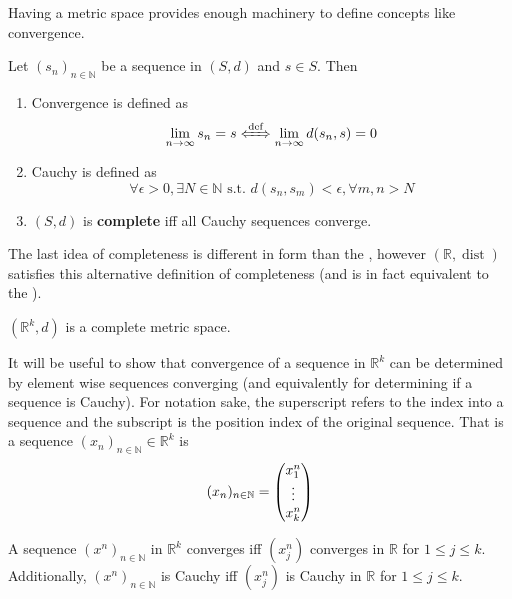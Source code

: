 \documentclass[../notes.tex]{subfiles}
\begin{document}
Having a metric space provides enough machinery to define concepts like convergence.

\begin{definition}
    Let $(s_n)_{n\in \mathbb{N}}$ be a sequence in $(S, d)$ and $s \in S$. Then
    \begin{enumerate}
        \item Convergence is defined as
            \[
                \lim_{n \to \infty} s_n = s \xLeftrightarrow{\text{def}} \lim_{n\to \infty} d(s_n, s) = 0
            \]
        \item Cauchy is defined as
            \[
                \forall \epsilon > 0, \exists N \in \mathbb{N} \text{ s.t. } d(s_n, s_m) < \epsilon, \forall m,n > N
            \]
        \item $(S,d)$ is \textbf{complete} iff all Cauchy sequences converge.
    \end{enumerate}
\end{definition}

The last idea of completeness is different in form than the , however $(\mathbb{R}, \operatorname{dist})$ satisfies this alternative definition of completeness (and is in fact equivalent to the ).

\begin{theorem}
    \label{thm:rkmetricspace}
    $(\mathbb{R}^k, d)$ is a complete metric space.
\end{theorem}

It will be useful to show that convergence of a sequence in $\mathbb{R}^k$ can be determined by element wise sequences converging (and equivalently for determining if a sequence is Cauchy). For notation sake, the superscript refers to the index into a sequence and the subscript is the position index of the original sequence. That is a sequence $(x_n)_{n\in \mathbb{N}} \in \mathbb{R}^k$ is
\[
    (x_n)_{n\in \mathbb{N}} = \mqty(
    x_1^{n} \\
    \vdots \\
    x_k^{n} \\
    )
\]

\begin{lemma}
    \label{lem:elementwisesequences}
    A sequence $(x^n)_{n\in \mathbb{N}}$ in $\mathbb{R}^k$ converges iff $(x^n_j)$ converges in $\mathbb{R}$ for $1 \leq j \leq k$. Additionally, $(x^n)_{n\in \mathbb{N}}$ is Cauchy iff $(x^n_j)$ is Cauchy in $\mathbb{R}$ for $1 \leq j \leq k$.
\end{lemma}
\end{document}
